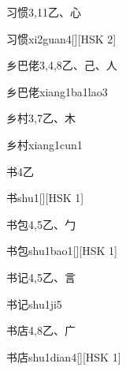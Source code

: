 \begin{entry}{习惯}{3,11}{⼄、⼼}
  \begin{phonetics}{习惯}{xi2guan4}[][HSK 2]
  \end{phonetics}
\end{entry}

\begin{entry}{乡巴佬}{3,4,8}{⼄、⼰、⼈}
  \begin{phonetics}{乡巴佬}{xiang1ba1lao3}
  \end{phonetics}
\end{entry}

\begin{entry}{乡村}{3,7}{⼄、⽊}
  \begin{phonetics}{乡村}{xiang1cun1}
  \end{phonetics}
\end{entry}

\begin{entry}{书}{4}{⼄}
  \begin{phonetics}{书}{shu1}[][HSK 1]
  \end{phonetics}
\end{entry}

\begin{entry}{书包}{4,5}{⼄、⼓}
  \begin{phonetics}{书包}{shu1bao1}[][HSK 1]
  \end{phonetics}
\end{entry}

\begin{entry}{书记}{4,5}{⼄、⾔}
  \begin{phonetics}{书记}{shu1ji5}
  \end{phonetics}
\end{entry}

\begin{entry}{书店}{4,8}{⼄、⼴}
  \begin{phonetics}{书店}{shu1dian4}[][HSK 1]
  \end{phonetics}
\end{entry}

